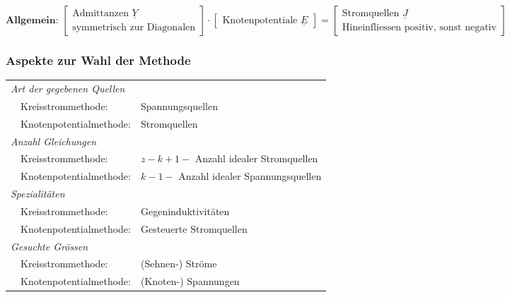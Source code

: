 $$\textbf{Allgemein: }\left[ \begin{array}{cc}
       \text{Admittanzen $\underline{Y}$} \\
       \text{symmetrisch zur Diagonalen}
       \end{array}\right] \cdot \left[ \begin{array}{cc}
     \text{Knotenpotentiale $\underline{E}$}
     \end{array}\right] =
\left[ \begin{array}{cc}
     \text{Stromquellen $\underline{J}$} \\
    \text{Hineinfliessen positiv, sonst negativ}
     \end{array}\right]$$

\subsubsection{Aspekte zur Wahl der Methode}
\begin{tabular}{lll}
\multicolumn{3}{l}{\textit{Art der gegebenen Quellen}}\\
&Kreisstrommethode: &Spannungsquellen\\
&Knotenpotentialmethode: &Stromquellen\\
\multicolumn{3}{l}{\textit{Anzahl Gleichungen}}\\ &Kreisstrommethode: &$z-k+1-$ Anzahl idealer Stromquellen\\
&Knotenpotentialmethode: &$k-1-$ Anzahl idealer Spannungsquellen\\
\multicolumn{3}{l}{\textit{Spezialitäten}}\\
&Kreisstrommethode: &Gegeninduktivitäten\\
&Knotenpotentialmethode: &Gesteuerte Stromquellen\\
\multicolumn{3}{l}{\textit{Gesuchte Grössen}}\\
&Kreisstrommethode: &(Sehnen-) Ströme\\
&Knotenpotentialmethode: &(Knoten-) Spannungen
\end{tabular}

